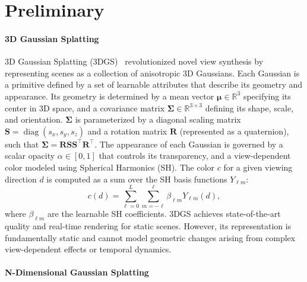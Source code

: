 \documentclass{article}
\theoremstyle{plain}
\theoremstyle{definition}
\theoremstyle{remark}
\begin{document}
\section{Preliminary}


\paragraph{3D Gaussian Splatting}
3D Gaussian Splatting (3DGS)~\cite{3dgs} revolutionized novel view synthesis by representing scenes as a collection of anisotropic 3D Gaussians. Each Gaussian is a primitive defined by a set of learnable attributes that describe its geometry and appearance. Its geometry is determined by a mean vector \(\boldsymbol{\mu} \in \mathbb{R}^3\) specifying its center in 3D space, and a covariance matrix \(\boldsymbol{\Sigma} \in \mathbb{R}^{3 \times 3}\) defining its shape, scale, and orientation. \(\boldsymbol{\Sigma}\) is parameterized by a diagonal scaling matrix \(\mathbf{S} = \operatorname{diag}(s_x, s_y, s_z)\) and a rotation matrix \(\mathbf{R}\) (represented as a quaternion), such that \(\boldsymbol{\Sigma} = \mathbf{R} \mathbf{S} \mathbf{S}^\top \mathbf{R}^\top\). The appearance of each Gaussian is governed by a scalar opacity \(\alpha \in [0, 1]\) that controls its transparency, and a view-dependent color modeled using Spherical Harmonics (SH). The color \(c\) for a given viewing direction \(d\) is computed as a sum over the SH basis functions \(Y_{\ell m}\):
\begin{equation}
c(d) = \sum_{\ell=0}^{L} \sum_{m=-\ell}^{\ell} \beta_{\ell m} Y_{\ell m}(d),
\end{equation}
where \(\beta_{\ell m}\) are the learnable SH coefficients. 3DGS achieves state-of-the-art quality and real-time rendering for static scenes. However, its representation is fundamentally static and cannot model geometric changes arising from complex view-dependent effects or temporal dynamics.

\paragraph{N-Dimensional Gaussian Splatting}
\end{document}
